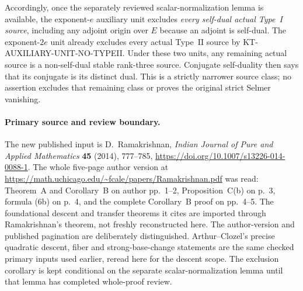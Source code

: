 Accordingly, once the separately reviewed scalar-normalization
lemma is available, the exponent-$e$ auxiliary unit excludes
\emph{every self-dual actual Type~I source}, including any
adjoint origin over $E$ because an adjoint is self-dual.
The exponent-$2e$ unit already excludes every actual Type~II
source by KT-AUXILIARY-UNIT-NO-TYPEII.
Under these two units, any remaining actual source is a
non-self-dual stable rank-three source.  Conjugate self-duality
then says that its conjugate is its distinct dual.  This is a
strictly narrower source class; no assertion excludes that
remaining class or proves the original strict Selmer vanishing.

\paragraph{Primary source and review boundary.}
The new published input is D.~Ramakrishnan, \emph{Indian Journal
of Pure and Applied Mathematics} \textbf{45} (2014), 777--785,
\url{https://doi.org/10.1007/s13226-014-0088-1}.
The whole five-page author version at
\url{https://math.uchicago.edu/~fcale/papers/Ramakrishnan.pdf}
was read: Theorem~A and Corollary~B on author pp.~1--2,
Proposition~C(b) on p.~3, formula (6b) on p.~4, and the
complete Corollary~B proof on pp.~4--5.  The foundational
descent and transfer theorems it cites are imported through
Ramakrishnan's theorem, not freshly reconstructed here.
The author-version and published pagination are deliberately
distinguished.  Arthur--Clozel's precise quadratic descent,
fiber and strong-base-change statements are the same checked
primary inputs used earlier, reread here for the descent scope.
The exclusion corollary is kept conditional on the separate
scalar-normalization lemma until that lemma has completed
whole-proof review.

